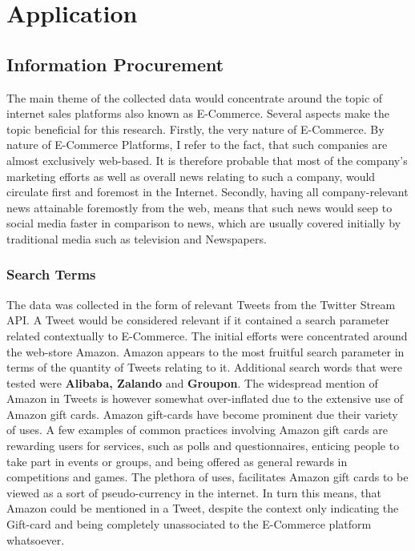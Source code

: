\section{Application}
	\subsection{Information Procurement}
	The main theme of the collected data would concentrate around the topic of internet sales platforms also known as E-Commerce. Several aspects make the topic beneficial for this research. Firstly, the very nature of E-Commerce. By nature of E-Commerce Platforms, I refer to the fact, that such companies are almost exclusively web-based. It is therefore probable that most of the company's marketing efforts as well as overall news relating to such a company, would circulate first and foremost in the Internet. Secondly, having all company-relevant news attainable foremostly from the web, means that such news would seep to social media faster in comparison to news, which are usually covered initially by traditional media such as television and Newspapers. 
	
		\subsubsection*{Search Terms}
		The data was collected in the form of relevant Tweets from the Twitter Stream API. A Tweet would be considered relevant if it contained a search parameter related contextually to E-Commerce. The initial efforts were concentrated around the web-store Amazon. Amazon appears to the most fruitful search parameter in terms of the quantity of Tweets relating to it. Additional search words that were tested were {\bfseries Alibaba, Zalando} and {\bfseries Groupon}. 
		The widespread mention of Amazon in Tweets is however somewhat over-inflated due to the extensive use of Amazon gift cards. Amazon gift-cards have become prominent due their variety of uses. A few examples of common practices involving Amazon gift cards are rewarding users for services, such as polls and questionnaires, enticing people to take part in events or groups, and being offered as general rewards in competitions and games. The plethora of uses, facilitates Amazon gift cards to be viewed as a sort of pseudo-currency in the internet. In turn this means, that Amazon could be mentioned in a Tweet, despite the context only indicating the Gift-card and being completely unassociated to the E-Commerce platform whatsoever.
		
